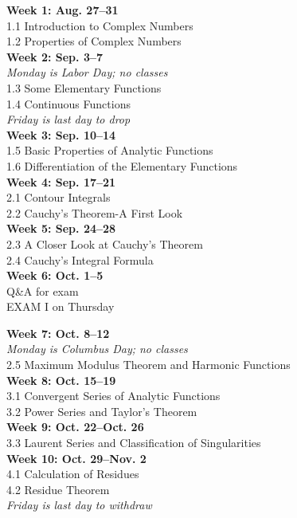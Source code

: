 \documentclass[11pt]{article}
\begin{document}
{\bf Week 1: Aug. 27--31}\\
1.1 Introduction to Complex Numbers\\
1.2 Properties of Complex Numbers\\

{\bf Week 2: Sep. 3--7}\\ %
{\it Monday is Labor Day; no classes}\\
1.3 Some Elementary Functions\\
1.4 Continuous Functions\\
{\it Friday is last day to drop}\\

{\bf Week 3: Sep. 10--14}\\ %
1.5 Basic Properties of Analytic Functions\\
1.6 Differentiation of the Elementary Functions\\


{\bf Week 4: Sep. 17--21}\\ %
2.1 Contour Integrals\\
2.2 Cauchy's Theorem-A First Look\\

{\bf Week 5: Sep. 24--28}\\ 
2.3 A Closer Look at Cauchy's Theorem\\
2.4 Cauchy's Integral Formula\\

{\bf Week 6: Oct. 1--5}\\ 
Q\&A for exam\\
EXAM I on Thursday\\ 
\newpage

{\bf Week 7: Oct. 8--12}\\ 
{\it Monday is Columbus Day; no classes}\\
2.5 Maximum Modulus Theorem and Harmonic Functions\\

{\bf Week 8: Oct. 15--19}\\ 
3.1 Convergent Series of Analytic Functions\\
3.2 Power Series and Taylor's Theorem\\

{\bf Week 9: Oct. 22--Oct. 26} \\ 
3.3 Laurent Series and Classification of Singularities  \\

{\bf Week 10: Oct. 29--Nov. 2}\\
4.1 Calculation of Residues\\
4.2 Residue Theorem\\
{\it  Friday is last day to withdraw}\\
\end{document}
